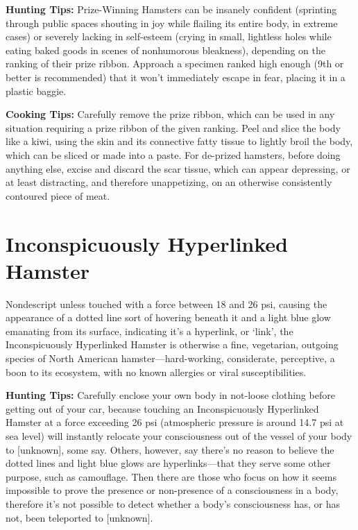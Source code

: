 \documentclass[10pt,twoside,openright]{memoir}
\begin{document}
\noindent
\textbf{Hunting Tips:} Prize-Winning Hamsters can be insanely confident (sprinting
through public spaces shouting in joy while flailing its entire body, in extreme
cases) or severely lacking in self-esteem (crying in small, lightless holes
while eating baked goods in scenes of nonhumorous bleakness), depending on the
ranking of their prize ribbon. Approach a specimen ranked high enough (9th or
better is recommended) that it won't immediately escape in fear, placing it
in a plastic baggie.

\vspace{1em}
\noindent
\textbf{Cooking Tips:} Carefully remove the prize ribbon, which can be used in any
situation requiring a prize ribbon of the given ranking. Peel and slice the body
like a kiwi, using the skin and its connective fatty tissue to lightly broil the
body, which can be sliced or made into a paste. For de-prized hamsters, before
doing anything else, excise and discard the scar tissue, which can appear
depressing, or at least distracting, and therefore unappetizing, on an otherwise
consistently contoured piece of meat.

\chapter*{Inconspicuously Hyperlinked Hamster}

Nondescript unless touched with a force between 18 and 26 psi, causing the
appearance of a dotted line sort of hovering beneath it and a light blue glow
emanating from its surface, indicating it's a hyperlink, or `link',
the Inconspicuously Hyperlinked Hamster is otherwise a fine, vegetarian,
outgoing species of North American hamster---hard-working, considerate,
perceptive, a boon to its ecosystem, with no known allergies or viral
susceptibilities.

\noindent
\textbf{Hunting Tips:} Carefully enclose your own body in not-loose clothing before
getting out of your car, because touching an Inconspicuously Hyperlinked Hamster
at a force exceeding 26 psi (atmospheric pressure is around 14.7 psi at sea
level) will instantly relocate your consciousness out of the vessel of your body
to [unknown], some say. Others, however, say there's no reason to believe
the dotted lines and light blue glows are hyperlinks---that they serve some
other purpose, such as camouflage. Then there are those who focus on how it
seems impossible to prove the presence or non-presence of a consciousness in a
body, therefore it's not possible to detect whether a body's
consciousness has, or has not, been teleported to [unknown]. 
\end{document}
